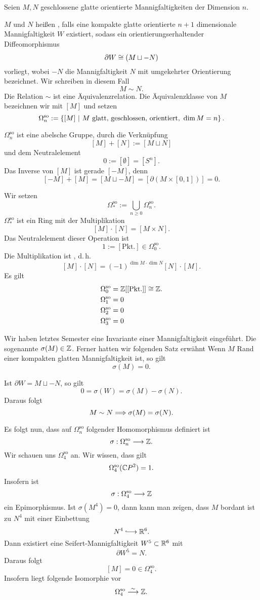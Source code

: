 \Def{}
Seien $M,N$ geschlossene glatte orientierte Mannigfaltigkeiten der Dimension $n$.

$M$ und $N$ heißen , falls eine kompakte glatte orientierte $n+1$ dimensionale Mannigfaltigkeit $W$ existiert, sodass ein orientierungserhaltender Diffeomorphismus
\[ \partial W \overset{}{\cong} (M \sqcup -N) \]
vorliegt, wobei $-N$ die Mannigfaltigkeit $N$ mit umgekehrter Orientierung bezeichnet. Wir schreiben in diesem Fall
\[ M \sim N. \]
Die Relation $\sim$ ist eine Äquivalenzrelation. Die Äquivalenzklasse von $M$ bezeichnen wir mit $[M]$ und setzen
\newcommand{\sso}{\Omega^{\mathrm{so}}}
\[ \sso_n :=
\set{[M]}{ M \text{ glatt, geschlossen, orientiert, } \dim M = n}.
 \]

$\sso_n$ ist eine abelsche Gruppe, durch die Verknüpfung
\[ [M] + [N]:= [M\sqcup N] \]
und dem Neutralelement
\[ 0 := [\emptyset] = [S^n]. \]
Das Inverse von $[M]$ ist gerade $[-M]$, denn
\[ [-M] + [M] = [M \sqcup -M] = [\partial (M\times [0,1])] = 0. \]


Wir setzen
\[ \sso_* := \bigcup_{n\geq 0} \sso_n. \]
$\sso_*$ ist ein Ring mit der Multiplikation
\[ [M] \cdot [N] = [M\times N]. \]
Das Neutralelement dieser Operation ist
\[ 1:= [\text{Pkt.}] \in \sso_0. \]
Die Multiplikation ist , d.\,h.
\[ [M] \cdot [N] = (-1)^{\dim M \cdot \dim N} [N] \cdot [M]. \]
Es gilt
\begin{align*}
\sso_0 &= \Z[[\text{Pkt.}]]\isom{} \Z.\\
\sso_1 &= 0\\
\sso_2 &= 0\\
\sso_3 &= 0
\end{align*}

Wir haben letztes Semester eine Invariante einer Mannigfaltigkeit eingeführt. Die sogenannte  $\sigma(M) \in \mathbb{Z}$. Ferner hatten wir folgenden Satz erwähnt
Wenn $M$ Rand einer kompakten glatten Mannigfaltigkeit ist, so gilt
\[ \sigma(M) = 0. \]

Ist $\partial W = M \sqcup -N$, so gilt
\[ 0 = \sigma(W) = \sigma(M) - \sigma(N). \]
Daraus folgt
\[ M \sim N \overset{}{\Longrightarrow} \sigma(M) = \sigma(N). \]

Es folgt nun, dass auf $\sso_n$ folgender Homomorphismus definiert ist
\[ \sigma : \sso_n \Pfeil{} \Z. \]
Wir schauen uns $\sso_4$ an. Wir wissen, dass gilt
\[ \sso_4(\C P^2) = 1. \]
Insofern ist
\[ \sigma : \sso_4 \Pfeil{} \Z \]
ein Epimorphismus. Ist $\sigma(M^4) = 0$, dann kann man zeigen, dass $M$ bordant ist zu $N^4$ mit einer Einbettung
\[ N^4 \Inj{} \R^6. \]
Dann existiert eine Seifert-Mannigfaltigkeit $W^5 \subset \mathbb{R}^6$ mit
\[ \partial W^5 = N. \]
Daraus folgt
\[ [M] = 0 \in \sso_4. \]
Insofern liegt folgende Isomorphie vor
\[ \sso_4 \Pfeil{\sim} \Z. \]


